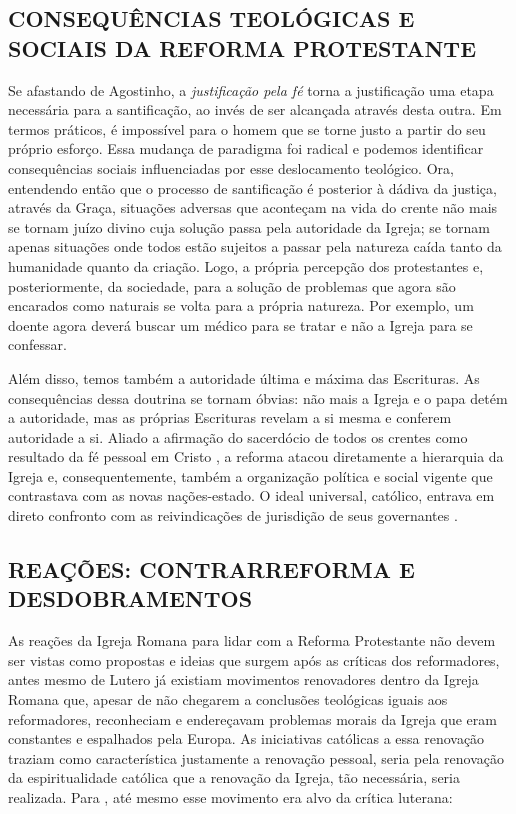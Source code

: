 \documentclass[
    article,            %
	12pt,				%
	oneside,			%
	a4paper,			%
	chapter=TITLE,		%
	section=TITLE,		%
	english,			%
	french,				%
	spanish,			%
	brazil				%
	]{abntex2}
\begin{document}
\subsection{CONSEQUÊNCIAS TEOLÓGICAS E SOCIAIS DA REFORMA PROTESTANTE}
Se afastando de Agostinho, a \emph{justificação pela fé} torna a justificação uma etapa necessária para a santificação, ao invés de ser alcançada através desta outra. Em termos práticos, é impossível para o homem que se torne justo a partir do seu próprio esforço. Essa mudança de paradigma foi radical e podemos identificar consequências sociais influenciadas por esse deslocamento teológico. Ora, entendendo então que o processo de santificação é posterior à dádiva da justiça, através da Graça, situações adversas que aconteçam na vida do crente não mais se tornam juízo divino cuja solução passa pela autoridade da Igreja; se tornam apenas situações onde todos estão sujeitos a passar pela natureza caída tanto da humanidade quanto da criação. Logo, a própria percepção dos protestantes e, posteriormente, da sociedade, para a solução de problemas que agora são encarados como naturais se volta para a própria natureza. Por exemplo, um doente agora deverá buscar um médico para se tratar e não a Igreja para se confessar.

Além disso, temos também a autoridade última e máxima das Escrituras. As consequências dessa doutrina se tornam óbvias: não mais a Igreja e o papa detém a autoridade, mas as próprias Escrituras revelam a si mesma e conferem autoridade a si. Aliado a afirmação do sacerdócio de todos os crentes como resultado da fé pessoal em Cristo \cite[p.263]{CAIRNS}, a reforma atacou diretamente a hierarquia da Igreja e, consequentemente, também a organização política e social vigente que contrastava com as novas nações-estado. O ideal universal, católico, entrava em direto confronto com as reivindicações de jurisdição de seus governantes \cite[p.252]{CAIRNS}.

\subsection{REAÇÕES: CONTRARREFORMA E DESDOBRAMENTOS}
As reações da Igreja Romana para lidar com a Reforma Protestante não devem ser vistas como propostas e ideias que surgem após as críticas dos reformadores, antes mesmo de Lutero já existiam movimentos renovadores dentro da Igreja Romana que, apesar de não chegarem a conclusões teológicas iguais aos reformadores, reconheciam e endereçavam problemas morais da Igreja que eram constantes e espalhados pela Europa. As iniciativas católicas a essa renovação traziam como característica justamente a renovação pessoal, seria pela renovação da espiritualidade católica que a renovação da Igreja, tão necessária, seria realizada. Para , até mesmo esse movimento era alvo da crítica luterana:
\end{document}
